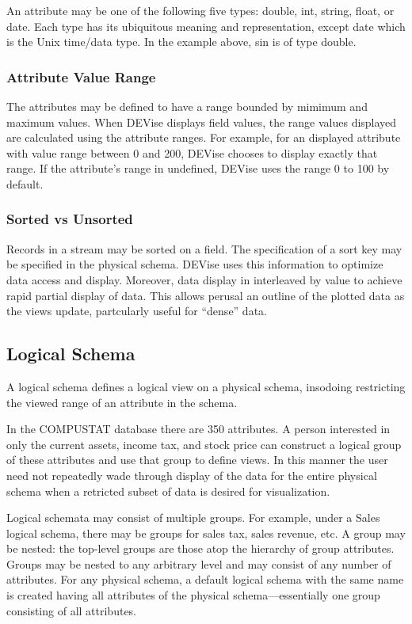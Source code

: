 An attribute may be one of the following five types: double, int, string, float,
or date. Each type has its ubiquitous meaning and representation, except date
which is the Unix time/data type. In the example above, sin is of type double.

\subsubsection{Attribute Value Range}

The attributes may be defined to have a range bounded by mimimum and maximum
values. When DEVise displays field values, the range values displayed are
calculated using the attribute ranges. For example, for an displayed attribute
with value range between 0 and 200, DEVise chooses to display exactly that
range. If the attribute's range in undefined, DEVise uses the range 0 to 100 by
default.

\subsubsection{Sorted vs Unsorted}

Records in a stream may be sorted on a field. The specification of a sort key
may be specified in the physical schema. DEVise uses this information to
optimize data access and display. Moreover, data display in interleaved by value
to achieve rapid partial display of data. This allows perusal an outline of the
plotted data as the views update, partcularly useful for ``dense'' data.


\subsection{Logical Schema}

A logical schema defines a logical view on a physical schema, insodoing
restricting the viewed range of an attribute in the schema.

In the COMPUSTAT database there are 350 attributes. A person interested in only
the current assets, income tax, and stock price can construct a logical group of
these attributes and use that group to define views. In this manner the user
need not repeatedly wade through display of the data for the entire physical
schema when a retricted subset of data is desired for visualization.

Logical schemata may consist of multiple groups. For example, under a Sales
logical schema, there may be groups for sales tax, sales revenue, etc. A group
may be nested: the top-level groups are those atop the hierarchy of group
attributes. Groups may be nested to any arbitrary level and may consist of any
number of attributes. For any physical schema, a default logical schema with the
same name is created having all attributes of the physical schema---essentially
one group consisting of all attributes.

